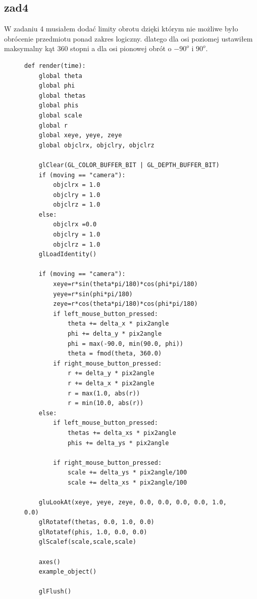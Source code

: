 \documentclass[]{article}
\begin{document}
\subsection{zad4}
W zadaniu 4 musiałem dodać limity obrotu dzięki którym nie możliwe było obrócenie przedmiotu ponad zakres logiczny. dlatego dla osi poziomej ustawiłem maksymalny kąt 360 stopni a dla osi pionowej obrót o $-90^o$ i $90^o$.
\begin{figure}[H]
	\begin{verbatim}
def render(time):
    global theta
    global phi
    global thetas
    global phis
    global scale
    global r
    global xeye, yeye, zeye
    global objclrx, objclry, objclrz

    glClear(GL_COLOR_BUFFER_BIT | GL_DEPTH_BUFFER_BIT)
    if (moving == "camera"):
        objclrx = 1.0
        objclry = 1.0
        objclrz = 1.0
    else:
        objclrx =0.0
        objclry = 1.0
        objclrz = 1.0
    glLoadIdentity()
    
    if (moving == "camera"):
        xeye=r*sin(theta*pi/180)*cos(phi*pi/180)
        yeye=r*sin(phi*pi/180)
        zeye=r*cos(theta*pi/180)*cos(phi*pi/180)
        if left_mouse_button_pressed:
            theta += delta_x * pix2angle
            phi += delta_y * pix2angle
            phi = max(-90.0, min(90.0, phi))
            theta = fmod(theta, 360.0)
        if right_mouse_button_pressed:
            r += delta_y * pix2angle
            r += delta_x * pix2angle
            r = max(1.0, abs(r))
            r = min(10.0, abs(r))
    else:
        if left_mouse_button_pressed:
            thetas += delta_xs * pix2angle
            phis += delta_ys * pix2angle

        if right_mouse_button_pressed:
            scale += delta_ys * pix2angle/100
            scale += delta_xs * pix2angle/100

    gluLookAt(xeye, yeye, zeye, 0.0, 0.0, 0.0, 0.0, 1.0, 0.0)
    glRotatef(thetas, 0.0, 1.0, 0.0)
    glRotatef(phis, 1.0, 0.0, 0.0)
    glScalef(scale,scale,scale)

    axes()
    example_object()

    glFlush()
	\end{verbatim}
\end{figure}
\end{document}
